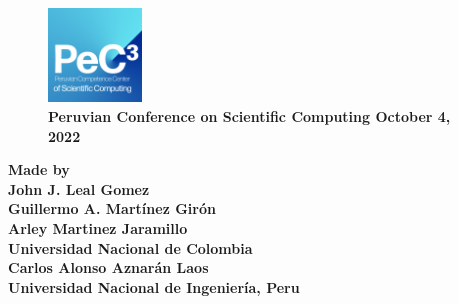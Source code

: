 {\begin{frame}
	\begin{minipage}{0.47\textwidth}
		\begin{figure}[ht!]
			\centering
			\includegraphics[height=2.5cm]{pec3}
			\caption*{
				\large
				\bfseries
				\textcolor{c++reviewduneblue}{
					Peruvian Conference on Scientific Computing
					October 4, 2022}
			}
		\end{figure}
	\end{minipage}
	\begin{minipage}{0.5\textwidth}
		\begin{flushright}
			\large
			\bfseries
			Made by\\
			John J. Leal Gomez\\
			Guillermo A. Martínez Girón\\
			Arley Martinez Jaramillo\\
			Universidad Nacional de Colombia\\
			Carlos Alonso Aznarán Laos\\
			Universidad Nacional de Ingeniería, Peru
		\end{flushright}
	\end{minipage}
\end{frame}
}